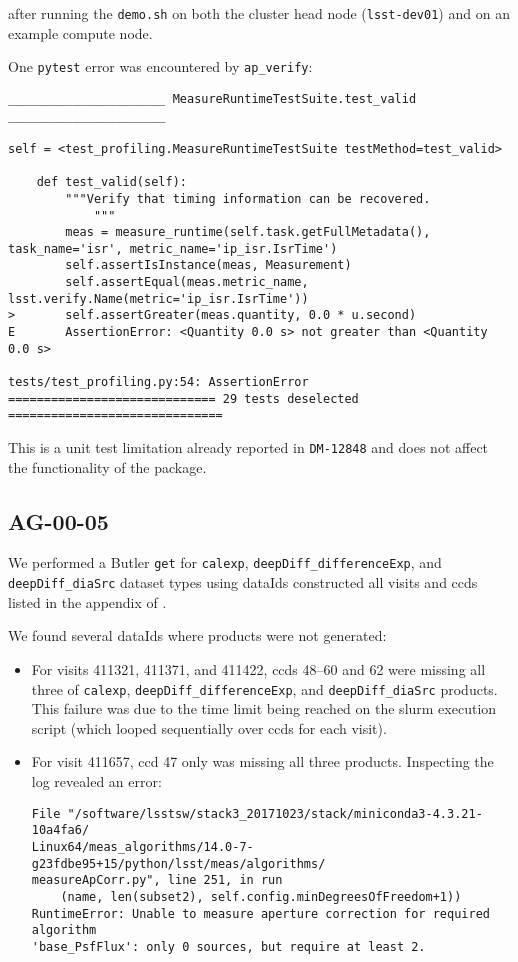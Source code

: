 \documentclass[DM,lsstdraft,STR,toc]{lsstdoc}
\begin{document}
after running the \texttt{demo.sh} on both the cluster head node (\texttt{lsst-dev01}) and on an example compute node.

One \texttt{pytest} error was encountered by \texttt{ap\_verify}:

\begin{verbatim}
______________________ MeasureRuntimeTestSuite.test_valid ______________________

self = <test_profiling.MeasureRuntimeTestSuite testMethod=test_valid>

    def test_valid(self):
        """Verify that timing information can be recovered.
            """
        meas = measure_runtime(self.task.getFullMetadata(), task_name='isr', metric_name='ip_isr.IsrTime')
        self.assertIsInstance(meas, Measurement)
        self.assertEqual(meas.metric_name, lsst.verify.Name(metric='ip_isr.IsrTime'))
>       self.assertGreater(meas.quantity, 0.0 * u.second)
E       AssertionError: <Quantity 0.0 s> not greater than <Quantity 0.0 s>

tests/test_profiling.py:54: AssertionError
============================= 29 tests deselected ==============================\end{verbatim}

This is a unit test limitation already reported 
in \texttt{DM-12848} and does not affect the functionality of the package.

\subsection{AG-00-05}

We performed a Butler \texttt{get} for \texttt{calexp}, \texttt{deepDiff\_differenceExp}, and \texttt{deepDiff\_diaSrc} dataset types using 
dataIds constructed all visits and ccds listed in the appendix of .

We found several dataIds where products were not generated:  

\begin{itemize}
	\item For visits 411321, 411371, and 411422, ccds 48--60 and 62 were missing all three of \texttt{calexp}, \texttt{deepDiff\_differenceExp}, and \texttt{deepDiff\_diaSrc} products.  This failure was due to the time limit being reached on the slurm execution script (which looped sequentially over ccds for each visit).
	\item For visit 411657, ccd 47 only was missing all three products.  Inspecting the log revealed an error:
		\begin{verbatim}  
File "/software/lsstsw/stack3_20171023/stack/miniconda3-4.3.21-10a4fa6/
Linux64/meas_algorithms/14.0-7-g23fdbe95+15/python/lsst/meas/algorithms/
measureApCorr.py", line 251, in run
    (name, len(subset2), self.config.minDegreesOfFreedom+1))
RuntimeError: Unable to measure aperture correction for required algorithm 
'base_PsfFlux': only 0 sources, but require at least 2.
\end{verbatim}
\end{itemize}
\end{document}
